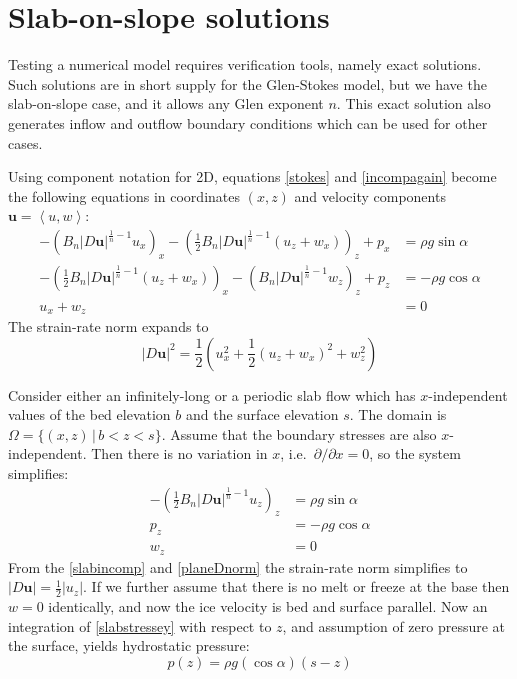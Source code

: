 \documentclass[letterpaper,final,12pt,reqno]{amsart}
\newcommand{\bu}{\mathbf{u}}
\begin{document}
\section{Slab-on-slope solutions}  \label{sec:slab}

Testing a numerical model requires verification tools, namely exact solutions.  Such solutions are in short supply for the Glen-Stokes model, but we have the slab-on-slope case, and it allows any Glen exponent $n$.  This exact solution also generates inflow and outflow boundary conditions which can be used for other cases.

Using component notation for 2D, equations \eqref{stokes} and \eqref{incompagain} become the following equations in coordinates $(x,z)$ and velocity components $\bu=\left<u,w\right>$:
\begin{align}
- \left(B_n |D\bu|^{\frac{1}{n}-1} u_x\right)_x - \left(\frac{1}{2} B_n |D\bu|^{\frac{1}{n}-1} \left(u_z+w_x\right)\right)_z + p_x &= \rho g\sin\alpha \label{planestressx} \\
- \left(\frac{1}{2} B_n |D\bu|^{\frac{1}{n}-1} \left(u_z+w_x\right)\right)_x - \left(B_n |D\bu|^{\frac{1}{n}-1} w_z\right)_z + p_z &= -\rho g\cos\alpha \label{planestressz} \\
u_x + w_z &= 0 \label{planeincomp}
\end{align}
The strain-rate norm expands to
\begin{equation}
    |D\bu|^2 = \frac{1}{2} \left(u_x^2 + \frac{1}{2}(u_z+w_x)^2 + w_z^2\right)  \label{planeDnorm}
\end{equation}

Consider either an infinitely-long or a periodic slab flow which has $x$-independent values of the bed elevation $b$ and the surface elevation $s$.  The domain is $\Omega = \{(x,z)\,|\,b < z < s\}$.  Assume that the boundary stresses are also $x$-independent.  Then there is no variation in $x$, i.e.~$\partial/\partial x=0$, so the system simplifies:
\begin{align}
- \left(\frac{1}{2}B_n |D\bu|^{\frac{1}{n}-1} u_z\right)_z &= \rho g\sin\alpha \label{slabstressex} \\
p_z &= -\rho g\cos\alpha \label{slabstressey} \\
w_z &= 0 \label{slabincomp}
\end{align}
From the \eqref{slabincomp} and \eqref{planeDnorm} the strain-rate norm simplifies to $|D\bu| = \frac{1}{2} |u_z|$.  If we further assume that there is no melt or freeze at the base then $w=0$ identically, and now the ice velocity is bed and surface parallel.  Now an integration of \eqref{slabstressey} with respect to $z$, and assumption of zero pressure at the surface, yields hydrostatic pressure:
\begin{equation}
p(z) = \rho g (\cos\alpha) (s-z)  \label{pslab}
\end{equation}
\end{document}
